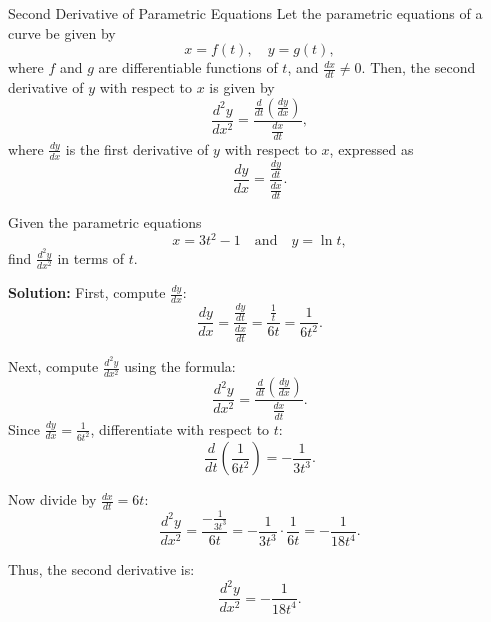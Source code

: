 \documentclass[12pt]{article}
\theoremstyle{beautifulthm}
\begin{document}
\begin{mytheorem}{Second Derivative of Parametric Equations}{}
   Let the parametric equations of a curve be given by 
\[
x = f(t), \quad y = g(t),
\]
where \(f\) and \(g\) are differentiable functions of \(t\), and \(\frac{dx}{dt} \neq 0\). Then, the second derivative of \(y\) with respect to \(x\) is given by
\[
\frac{d^2y}{dx^2} = \frac{\frac{d}{dt}\left(\frac{dy}{dx}\right)}{\frac{dx}{dt}},
\]
where \(\frac{dy}{dx}\) is the first derivative of \(y\) with respect to \(x\), expressed as
\[
\frac{dy}{dx} = \frac{\frac{dy}{dt}}{\frac{dx}{dt}}.
\] 
\end{mytheorem}


\begin{tcolorbox}[colback=examplebg, colframe=red!75!black, title=\textbf{EXAMPLE 1: Find the Derivetive of the Parametric Equation}, fonttitle=\bfseries, sharp corners]
Given the parametric equations 
\[
x = 3t^2 - 1 \quad \text{and} \quad y = \ln t,
\]
find \(\frac{d^2y}{dx^2}\) in terms of \(t\).


\tcblower
\textbf{Solution:} 
First, compute \(\frac{dy}{dx}\):
\[
\frac{dy}{dx} = \frac{\frac{dy}{dt}}{\frac{dx}{dt}} = \frac{\frac{1}{t}}{6t} = \frac{1}{6t^2}.
\]

Next, compute \(\frac{d^2y}{dx^2}\) using the formula:
\[
\frac{d^2y}{dx^2} = \frac{\frac{d}{dt}\left(\frac{dy}{dx}\right)}{\frac{dx}{dt}}.
\]
Since \(\frac{dy}{dx} = \frac{1}{6t^2}\), differentiate with respect to \(t\):
\[
\frac{d}{dt}\left(\frac{1}{6t^2}\right) = -\frac{1}{3t^3}.
\]

Now divide by \(\frac{dx}{dt} = 6t\):
\[
\frac{d^2y}{dx^2} = \frac{-\frac{1}{3t^3}}{6t} = -\frac{1}{3t^3} \cdot \frac{1}{6t} = -\frac{1}{18t^4}.
\]

Thus, the second derivative is:
\[
\frac{d^2y}{dx^2} = -\frac{1}{18t^4}.
\]
\end{tcolorbox}
\end{document}
